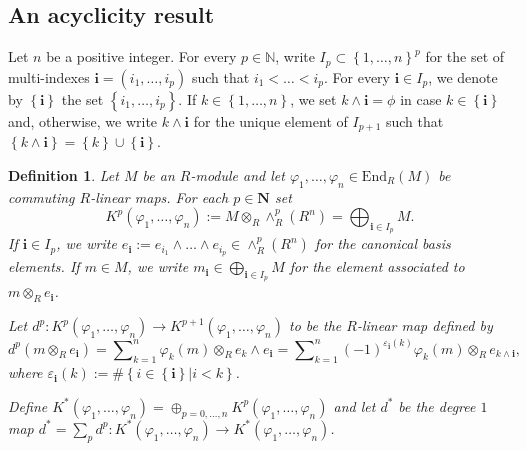 \documentclass[asterisque,english]{smfart}
\newtheorem{definition}{Definition}[]
\newcommand{\N}{\mathbf{N}}
\begin{document}
\subsection{An acyclicity result} 
Let $n$ be a positive integer. For every  $p\in \mathbb{N}$,
write $I_{p}\subset \left\{ 1,\ldots,n\right\} ^{p}$ for the set of
multi-indexes $\mathbf{i}=\left( i_{1},\ldots,i_{p}\right) $ such that $
i_{1}<\ldots<i_{p}$. For
every $\mathbf{i}\in I_{p}$, we denote by $\left\{ \mathbf{i}\right\} $ the
set $\left\{ i_{1},\ldots,i_{p}\right\} $. If $k\in
\left\{ 1,\ldots,n\right\} $, we set $k\wedge \mathbf{i}=\phi $ in case $k\in
\left\{ \mathbf{i}\right\} $ and, otherwise, we write $k\wedge \mathbf{i}$
for the unique element of $I_{p+1}$ such that $\left\{ k\wedge \mathbf{i}
\right\} =\left\{ k\right\} \cup \left\{ \mathbf{i}\right\} $. 

\begin{definition}
Let $M$ be an $R$-module and let $\varphi _{1},\ldots,\varphi _{n}\in \mathrm{End}_{R}\left( M\right) $  be commuting $R$-linear maps. For each $p\in \N$ set $$K^{p}\left( \varphi _{1},\ldots,\varphi _{n}\right) :=M\otimes
_{R}\wedge _{R}^{p}\left( R^{n}\right) =\bigoplus\nolimits_{\mathbf{i}\in
I_{p}}M.$$If $\mathbf{i}\in I_{p}$, we write $e_{\mathbf{i}
}:=e_{i_{1}}\wedge \ldots\wedge e_{i_{p}}\in \wedge _{R}^{p}\left( R^{n}\right) $ for  the canonical basis elements. If $m\in M$, we write $m_{\mathbf{i}}\in \bigoplus\nolimits_{\mathbf{i}\in
I_{p}}M$ for the element associated to $m\otimes _{R}e_{\mathbf{i}
}$.  

Let $d^{p}\colon K^{p}\left( \varphi _{1},\ldots,\varphi _{n}\right)
\rightarrow K^{p+1}\left( \varphi _{1},\ldots,\varphi _{n}\right) $ to be the $R$-linear map defined by 
\begin{equation}
d^{p}\left( m\otimes _{R}e_{\mathbf{i}}\right)
=\sum\nolimits_{k=1}^{n}\varphi _k\left( m\right) \otimes _{R}e_k\wedge
e_{\mathbf{i}}=\sum\nolimits_{k=1}^{n}\left( -1\right) ^{\varepsilon _{\mathbf{i}}\left( k\right)}\varphi
_k\left( m\right) \otimes _{R}e_{k\wedge \mathbf{i}},
\label{Kos F1}
\end{equation}where  $
\varepsilon _{\mathbf{i}}\left( k\right) :=\#\left\{ i\in \left\{ \mathbf{i}
\right\} \vert i<k\right\} $. 

Define  $K^\ast\left( \varphi
_{1},\ldots,\varphi _{n}\right)=\oplus_{p=0,\ldots,n} K^{p}\left( \varphi _{1},\ldots,\varphi _{n}\right) $ and let $d^\ast$ be the degree $1$ map $d^\ast=\sum_p d^p\colon K^\ast\left( \varphi
_{1},\ldots,\varphi _{n}\right) \to K^\ast\left( \varphi
_{1},\ldots,\varphi _{n}\right)$.

\end{definition}
\end{document}
